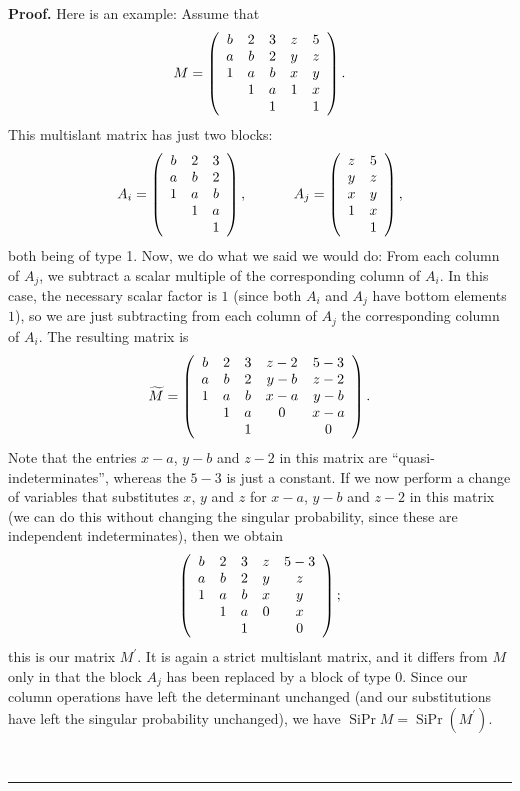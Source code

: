 \documentclass[numbers=enddot,12pt,final,onecolumn,notitlepage]{scrartcl}%
\theoremstyle{definition}
\newenvironment{proof}[1][Proof]{\noindent\textbf{#1.} }{\ \rule{0.5em}{0.5em}}
\theoremstyle{plainsl}
\begin{document}
\begin{proof}
Here is an example: Assume that
\[
M=\left(
\begin{array}
[c]{ccccc}%
b & 2 & 3 & z & 5\\
a & b & 2 & y & z\\
1 & a & b & x & y\\
& 1 & a & 1 & x\\
&  & 1 &  & 1
\end{array}
\right)  .
\]
This multislant matrix has just two blocks:
\[
A_{i}=\left(
\begin{array}
[c]{ccc}%
b & 2 & 3\\
a & b & 2\\
1 & a & b\\
& 1 & a\\
&  & 1
\end{array}
\right)  ,\ \ \ \ \ \ \ \ \ \ A_{j}=\left(
\begin{array}
[c]{cc}%
z & 5\\
y & z\\
x & y\\
1 & x\\
& 1
\end{array}
\right)  ,
\]
both being of type 1. Now, we do what we said we would do: From each column of
$A_{j}$, we subtract a scalar multiple of the corresponding column of $A_{i}$. In
this case, the necessary scalar factor is $1$ (since both $A_{i}$ and $A_{j}$
have bottom elements $1$), so we are just subtracting from each column of
$A_{j}$ the corresponding column of $A_{i}$. The resulting matrix is%
\[
\widetilde{M}=\left(
\begin{array}
[c]{ccccc}%
b & 2 & 3 & z-2 & 5-3\\
a & b & 2 & y-b & z-2\\
1 & a & b & x-a & y-b\\
& 1 & a & 0 & x-a\\
&  & 1 &  & 0
\end{array}
\right)  .
\]
Note that the entries $x-a$, $y-b$ and $z-2$ in this matrix are
``quasi-indeterminates'', whereas the $5-3$ is just a constant.
If we now perform a change of variables that substitutes $x$, $y$ and $z$ for
$x-a$, $y-b$ and $z-2$ in this matrix (we can do this without changing the
singular probability, since these are independent indeterminates), then we
obtain%
\[
\left(
\begin{array}
[c]{ccccc}%
b & 2 & 3 & z & 5-3\\
a & b & 2 & y & z\\
1 & a & b & x & y\\
& 1 & a & 0 & x\\
&  & 1 &  & 0
\end{array}
\right)  ;
\]
this is our matrix $M^{\prime}$. It is again a strict multislant matrix, and
it differs from $M$ only in that the block $A_{j}$ has been replaced by a
block of type 0. Since our column operations have left the determinant
unchanged (and our substitutions have left the singular probability
unchanged), we have $\operatorname*{SiPr}M=\operatorname*{SiPr}\left(
M^{\prime}\right)  $.


\end{proof}
\end{document}
